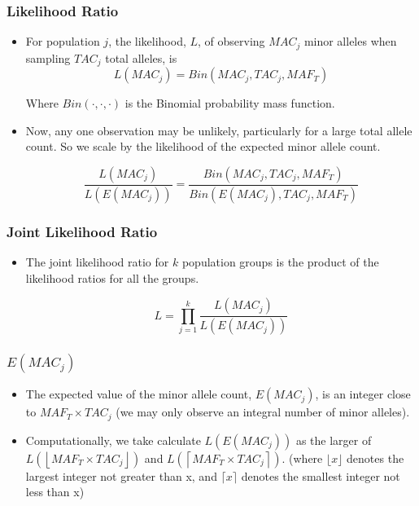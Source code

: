 \documentclass[aspectratio=1610]{beamer}
\begin{document}
\begin{frame}
\frametitle{Likelihood Ratio}
\begin{itemize}
\item For population $j$, the likelihood, $L$, of observing $MAC_j$
	minor alleles when sampling $TAC_j$ total alleles, is
\begin{equation}
	L(MAC_j) = Bin(MAC_j, TAC_j, MAF_T)
\end{equation}

Where $Bin(\cdot,\cdot,\cdot)$ is the Binomial probability mass function.

\item Now, any one observation may be unlikely,
	particularly for a large total allele count.
	So we scale by the likelihood of the expected minor allele count.

\begin{equation}
	\frac{L(MAC_j)}{L(E(MAC_j))} = \frac{Bin(MAC_j, TAC_j, MAF_T)}{Bin(E(MAC_j), TAC_j, MAF_T)}
\end{equation}
\end{itemize}

\end{frame}

\begin{frame}
\frametitle{Joint Likelihood Ratio}
\begin{itemize}

\item The joint likelihood ratio for $k$ population groups
	is the product of the likelihood ratios for all the groups.

\begin{equation}
	L = \prod_{j=1}^{k} \frac{L(MAC_j)}{L(E(MAC_j))}
\end{equation}

\end{itemize}
\end{frame}

\begin{frame}
	\frametitle{$E(MAC_j)$}
\begin{itemize}
\item The expected value of the minor allele count, $E(MAC_j)$,
	is an integer close to $MAF_T\times{}TAC_j$
	(we may only observe an integral number of minor alleles).
\item Computationally, we take calculate $L(E(MAC_j))$ as the larger of
	$L(\left\lfloor{MAF_T\times{}TAC_j}\right\rfloor)$ and
	$L(\left\lceil{MAF_T\times{}TAC_j}\right\rceil)$.
	(where $\lfloor{}x\rfloor$ denotes the largest integer not greater than x,
	and $\lceil{}x\rceil$ denotes the smallest integer not less than x)

\end{itemize}

\end{frame}

%
\end{document}
